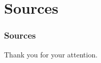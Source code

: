 \section{Sources}

\begin{frame}[allowframebreaks]
	\frametitle{Sources}
	\nocite{*}
%	
%	
	\printbibliography
\end{frame}


\begin{frame}[plain]
	\begin{center}
		\Large{{Thank you for your attention.}}
	\end{center}
\end{frame}



